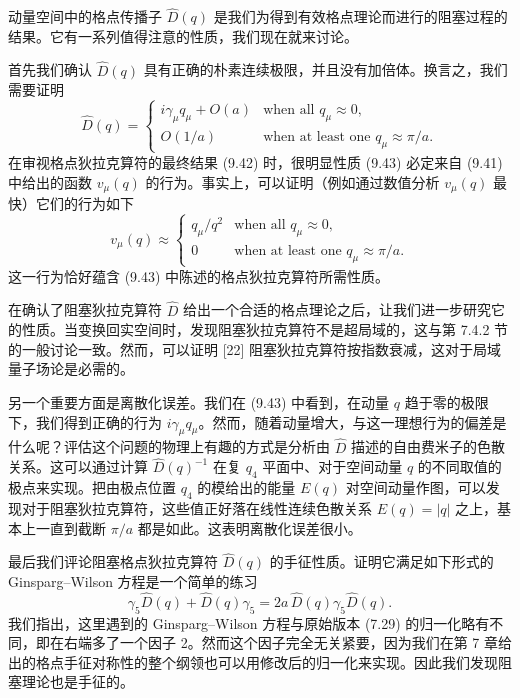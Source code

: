 动量空间中的格点传播子 $\hat D(q)$ 是我们为得到有效格点理论而进行的阻塞过程的结果。它有一系列值得注意的性质，我们现在就来讨论。

首先我们确认 $\hat D(q)$ 具有正确的朴素连续极限，并且没有加倍体。换言之，我们需要证明
\begin{equation}
  \hat D(q) = \begin{cases}
    i\gamma_\mu q_\mu + O(a) & \text{when all } q_\mu \approx 0 ,\\
    O(1/a) & \text{when at least one } q_\mu \approx \pi/a .
  \end{cases}
\end{equation}
在审视格点狄拉克算符的最终结果 (9.42) 时，很明显性质 (9.43) 必定来自 (9.41) 中给出的函数 $v_\mu(q)$ 的行为。事实上，可以证明（例如通过数值分析 $v_\mu(q)$ 最快）它们的行为如下
\begin{equation}
  v_\mu(q) \approx \begin{cases}
    q_\mu/q^2 & \text{when all } q_\mu \approx 0 ,\\
    0 & \text{when at least one } q_\mu \approx \pi/a .
  \end{cases}
\end{equation}
这一行为恰好蕴含 (9.43) 中陈述的格点狄拉克算符所需性质。

在确认了阻塞狄拉克算符 $\hat D$ 给出一个合适的格点理论之后，让我们进一步研究它的性质。当变换回实空间时，发现阻塞狄拉克算符不是超局域的，这与第 7.4.2 节的一般讨论一致。然而，可以证明 [22] 阻塞狄拉克算符按指数衰减，这对于局域量子场论是必需的。

另一个重要方面是离散化误差。我们在 (9.43) 中看到，在动量 $q$ 趋于零的极限下，我们得到正确的行为 $i\gamma_\mu q_\mu$。然而，随着动量增大，与这一理想行为的偏差是什么呢？评估这个问题的物理上有趣的方式是分析由 $\hat D$ 描述的自由费米子的色散关系。这可以通过计算 $\hat D(q)^{-1}$ 在复 $q_4$ 平面中、对于空间动量 $q$ 的不同取值的极点来实现。把由极点位置 $q_4$ 的模给出的能量 $E(q)$ 对空间动量作图，可以发现对于阻塞狄拉克算符，这些值正好落在线性连续色散关系 $E(q) = |q|$ 之上，基本上一直到截断 $\pi/a$ 都是如此。这表明离散化误差很小。

最后我们评论阻塞格点狄拉克算符 $\hat D(q)$ 的手征性质。证明它满足如下形式的 Ginsparg--Wilson 方程是一个简单的练习
\begin{equation}
  \gamma_5\hat D(q) + \hat D(q)\gamma_5 = 2a\,\hat D(q)\gamma_5\hat D(q) .
\end{equation}
我们指出，这里遇到的 Ginsparg--Wilson 方程与原始版本 (7.29) 的归一化略有不同，即在右端多了一个因子 2。然而这个因子完全无关紧要，因为我们在第 7 章给出的格点手征对称性的整个纲领也可以用修改后的归一化来实现。因此我们发现阻塞理论也是手征的。

